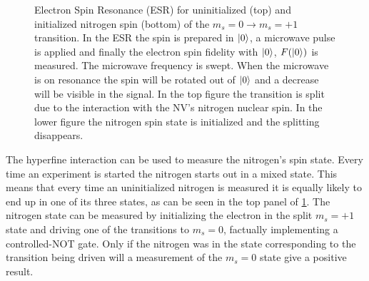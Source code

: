    \begin{figure}[htbp]
    \centering
        \caption{ Electron Spin Resonance (ESR) for uninitialized (top) and initialized nitrogen spin (bottom) of the $m_s =0 \rightarrow m_s = +1$ transition. In the ESR the spin is prepared in ${\left\vert{0}\right\rangle}$, a microwave pulse is applied and finally the electron spin fidelity with ${\left\vert{0}\right\rangle}$, $F({\left\vert{0}\right\rangle} )$ is measured.
        The microwave frequency is swept.
        When the microwave is on resonance the spin will be rotated out of ${\left\vert{0}\right\rangle} $ and a decrease will be visible in the signal.
        In the top figure the transition is split due to the interaction with the NV's nitrogen nuclear spin.
        In the lower figure the nitrogen spin state is initialized and the splitting disappears.}
        \label{fig:HF_split_levels}
    \end{figure}

The hyperfine interaction can be used to measure the nitrogen's spin state.
Every time an experiment is started the nitrogen starts out in a mixed state.
This means that every time an uninitialized nitrogen is measured it is equally likely to end up in one of its three states, as can be seen in the top panel of \cref{fig:HF_split_levels}.
The nitrogen state can be measured by initializing the electron in the split $m_s = +1$ state and driving one of the transitions to $m_s=0$, factually implementing a controlled-NOT gate.
Only if the nitrogen was in the state corresponding to the transition being driven will a measurement of the $m_s =0$ state give a positive result.


